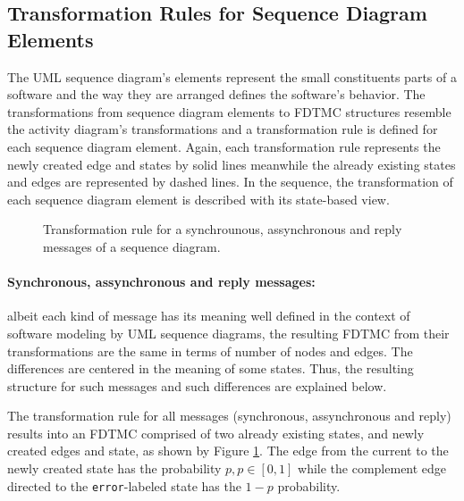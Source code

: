 \subsection{Transformation Rules for Sequence Diagram Elements
	\label{subsec:transformationRulesSequenceDiagramElements}}

The UML sequence diagram's elements represent the small constituents parts of a
software and the way they are arranged defines the software's behavior. The
transformations from sequence diagram elements to FDTMC structures resemble the
activity diagram's transformations and a transformation rule is defined for
each sequence diagram element. Again, each transformation rule represents the
newly created edge and states by solid lines meanwhile the already existing
states and edges are represented by dashed lines. In the sequence, the
transformation of each sequence diagram element is described with its
state-based view.

\begin{figure}[h!]
\begin{center}
	\resizebox{\columnwidth}{!}{

}
\end{center}
\caption{Transformation rule for a synchrounous, assynchronous and reply messages of a sequence diagram.}
\label{fig:transSync_SD}
\end{figure}

\paragraph{Synchronous, assynchronous and reply messages:
	\label{par:messagesTransformations}} 
albeit each kind of message has its meaning well defined in the context of
software modeling by UML sequence diagrams, the resulting FDTMC from their
transformations are the same in terms of number of nodes and edges. The
differences are centered in the meaning of some states. Thus, the resulting
structure for such messages and such differences are explained below. 

The transformation rule for all messages (synchronous, assynchronous and reply)
results into an FDTMC comprised of two already existing
states, and newly created edges and state, as shown by Figure
\ref{fig:transSync_SD}. The edge from the current to the newly created
state has the probability $p, p \in [0,1]$ while the complement edge directed
to the \texttt{error}-labeled state has the $1-p$ probability.

